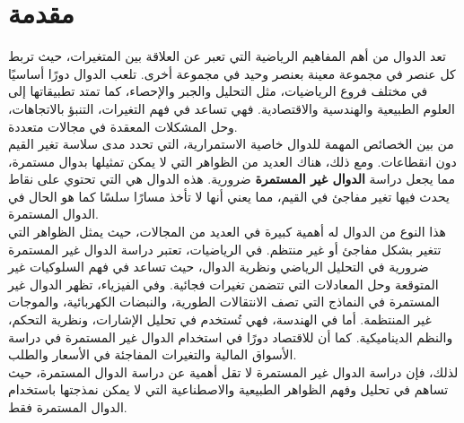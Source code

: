 \chapter*{مقدمة}
	\noindent
	تعد الدوال من أهم المفاهيم الرياضية التي تعبر عن العلاقة بين المتغيرات، حيث تربط كل عنصر في مجموعة معينة بعنصر وحيد في مجموعة أخرى. تلعب الدوال دورًا أساسيًا في مختلف فروع الرياضيات، مثل التحليل والجبر والإحصاء، كما تمتد تطبيقاتها إلى العلوم الطبيعية والهندسية والاقتصادية. فهي تساعد في فهم التغيرات، التنبؤ بالاتجاهات، وحل المشكلات المعقدة في مجالات متعددة.\cite{mathanalysis}\\[10pt]
	\noindent
	من بين الخصائص المهمة للدوال خاصية الاستمرارية، التي تحدد مدى سلاسة تغير القيم دون انقطاعات. ومع ذلك، هناك العديد من الظواهر التي لا يمكن تمثيلها بدوال مستمرة، مما يجعل دراسة \textbf{الدوال غير المستمرة} ضرورية. هذه الدوال هي التي تحتوي على نقاط يحدث فيها تغير مفاجئ في القيم، مما يعني أنها لا تأخذ مسارًا سلسًا كما هو الحال في الدوال المستمرة.\cite{realanal}\\[10pt]
	\noindent
	هذا النوع من الدوال له أهمية كبيرة في العديد من المجالات، حيث يمثل الظواهر التي تتغير بشكل مفاجئ أو غير منتظم. في الرياضيات، تعتبر دراسة الدوال غير المستمرة ضرورية في التحليل الرياضي ونظرية الدوال، حيث تساعد في فهم السلوكيات غير المتوقعة وحل المعادلات التي تتضمن تغيرات فجائية. وفي الفيزياء، تظهر الدوال غير المستمرة في النماذج التي تصف الانتقالات الطورية، والنبضات الكهربائية، والموجات غير المنتظمة. أما في الهندسة، فهي تُستخدم في تحليل الإشارات، ونظرية التحكم، والنظم الديناميكية. كما أن للاقتصاد دورًا في استخدام الدوال غير المستمرة في دراسة الأسواق المالية والتغيرات المفاجئة في الأسعار والطلب.\cite{introrealanal}\\[10pt]
	\noindent
	لذلك، فإن دراسة الدوال غير المستمرة لا تقل أهمية عن دراسة الدوال المستمرة، حيث تساهم في تحليل وفهم الظواهر الطبيعية والاصطناعية التي لا يمكن نمذجتها باستخدام الدوال المستمرة فقط.\cite{elemrealanal}
	
